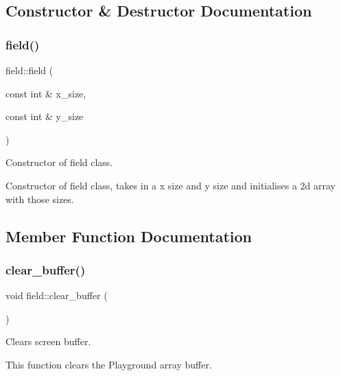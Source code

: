 \subsection{Constructor \& Destructor Documentation}
\mbox{\label{classfield_aed35371ff99892965f46835a32b57c41}} 
\subsubsection{\texorpdfstring{field()}{field()}}
{\footnotesize\ttfamily field\+::field (\begin{DoxyParamCaption}\item[{const int \&}]{x\+\_\+size,  }\item[{const int \&}]{y\+\_\+size }\end{DoxyParamCaption})\hspace{0.3cm}{\ttfamily [inline]}}



Constructor of field class. 

Constructor of field class, takes in a x size and y size and initialises a 2d array with those sizes. 

\subsection{Member Function Documentation}
\mbox{\label{classfield_a5a46a87df8d359135e5dabd900a92546}} 
\subsubsection{\texorpdfstring{clear\+\_\+buffer()}{clear\_buffer()}}
{\footnotesize\ttfamily void field\+::clear\+\_\+buffer (\begin{DoxyParamCaption}{ }\end{DoxyParamCaption})\hspace{0.3cm}{\ttfamily [inline]}}



Clears screen buffer. 

This function clears the Playground array buffer. \mbox{\label{classfield_acebf59882faff84102c239ac6ab63a09}} 
